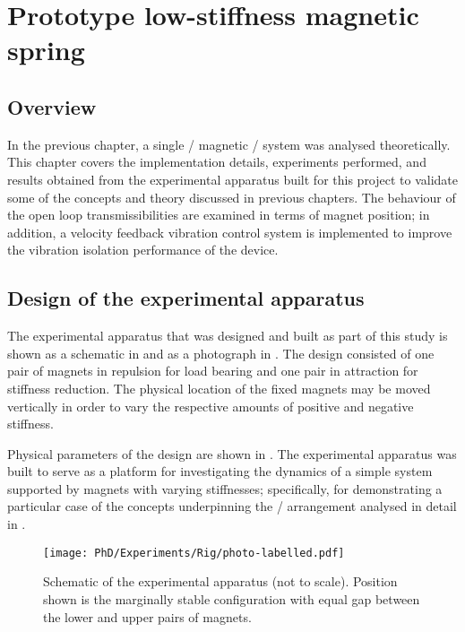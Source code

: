 \documentclass[11pt,a4paper]{memoir}
\begin{document}
\chapter{Prototype low-stiffness magnetic spring}


\section{Overview}

In the previous chapter, a single \dof/ magnetic \qzs/ system was analysed theoretically.
This chapter covers the implementation details, experiments performed, and results obtained from the experimental apparatus built for this project to validate some of the concepts and theory discussed in previous chapters.
The behaviour of the open loop transmissibilities are examined in terms of magnet position; in addition, a velocity feedback vibration control system is implemented to improve the vibration isolation performance of the device.

\section{Design of the experimental apparatus}

The experimental apparatus that was designed and built as part of this study is shown as a schematic in  and as a photograph in .
The design consisted of one pair of magnets in repulsion for load bearing and one pair in attraction for stiffness reduction.
The physical location of the fixed magnets may be moved vertically in order to vary the respective amounts of positive and negative stiffness.

Physical parameters of the design are shown in
. The experimental apparatus was built to serve as a platform for
investigating the dynamics of a simple system supported by magnets with
varying stiffnesses; specifically, for demonstrating a particular case of
the concepts underpinning the \qzs/ arrangement analysed in detail in .

\begin{figure}
  \caption[Schematic of the experimental apparatus.]{
    Schematic of the experimental apparatus (not to scale). Position shown is
    the marginally stable configuration with equal gap between the lower
    and upper pairs of magnets.}

  \hspace*{1cm}\texttt{[image: PhD/Experiments/Rig/photo-labelled.pdf]}
\end{figure}
\end{document}
